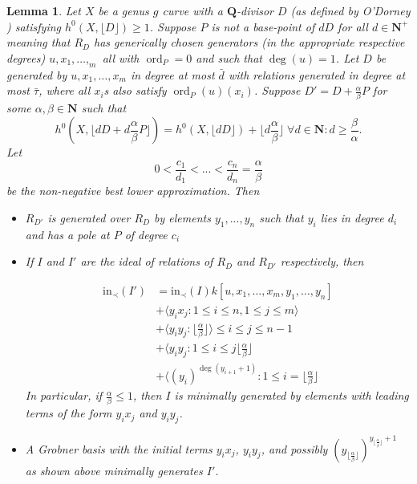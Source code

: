 \documentclass{amsart}
\theoremstyle{plain}
\newtheorem{lem}[thm]{Lemma}
\theoremstyle{definition}
\theoremstyle{remark}
\numberwithin{equation}{section}
\DeclareMathOperator{\ord}{ord}
\newcommand \initial{\text{in}}
\newcommand \gin{\text{gin}}
\begin{document}
\begin{lem}
\label{lem:deg1-sat-ind}
Let $X$ be a genus $g$ curve with a $\mathbf{Q}$-divisor $D$ (as
defined by O'Dorney )
satisfying $h^0(X, \lfloor{D}\rfloor)\ge 1$.  Suppose $P$ is not a base-point of $dD$ for all $d\in \mathbf{N}^+$ meaning that $R_D$ has generically chosen generators (in the appropriate respective degrees)
$u, x_1, \ldots, _m$ all with $\ord_P=0$ and such that $\deg(u)=1$.  Let $D$ be generated by $u, x_1, \ldots, x_m$ in degree at most $\bar{d}$ with relations generated 
in degree at most $\bar{\tau}$, where all $x_i$s also satisfy $\ord_P(u)(x_i)$.  Suppose $D' = D + \frac{\alpha}{\beta} P$
for some $\alpha,\beta \in \mathbf{N}$ such that
\begin{equation}
\label{eqn:deg1_sat_ind_dim}
	h^0(X, \lfloor{dD + d\frac{\alpha}{\beta} P \rfloor}) = h^0(X,\lfloor dD
	\rfloor) + \lfloor d\frac{\alpha} {\beta} \rfloor \; \forall d \in \mathbf{
	N} : d \ge \frac{\beta}{\alpha}.
\end{equation}
Let 
\[
	0<\frac{c_1}{d_1}<...<\frac{c_n}{d_n}=\frac{\alpha}{\beta}
\]
be the non-negative best lower approximation.
Then 
\begin{itemize}
\item $R_{D'}$ is generated over $R_D$ by elements $y_1,...,y_n$ such that $y_i$ lies in  
degree $d_i$ and has a pole at $P$ of degree $c_i$

\item If $I$ and $I'$ are the ideal of relations of $R_D$ and $R_{D'}$ respectively, then 

\begin{align*}
	\initial_\prec(I') &= \initial_\prec(I) k[u, x_1, \ldots, x_m, y_1, \ldots, y_n] \\
										 &+ \langle y_i x_j: 1 \le i \le n, 1 \le j \le m \rangle \\
										 &+ \langle y_i y_j: \lfloor \frac{\alpha}{\beta} \rfloor \rangle \le i \le j \le n-1 \\
										 &+ \langle y_i y_j: 1\le i\le j\lfloor \frac{\alpha}{\beta} \rfloor\\
										 &+ \langle (y_i)^{\deg(y_{i+1}+1)}: 1\le i=\lfloor \frac{\alpha}{\beta} \rfloor
\end{align*}
In particular, if $\frac{\alpha}{\beta}\le 1$, then $I$ is minimally generated by elements with leading terms of the form $y_ix_j$ and $y_iy_j$.
\item A Grobner basis with the initial terms $y_i x_j$, $y_iy_j$, and possibly $(y_{\lfloor \frac{\alpha}{\beta} \rfloor})^{y_{\lfloor \frac{\alpha}{\beta} \rfloor}+1}$ as shown above minimally generates $I'$.
\end{itemize}
\end{lem}
\end{document}
